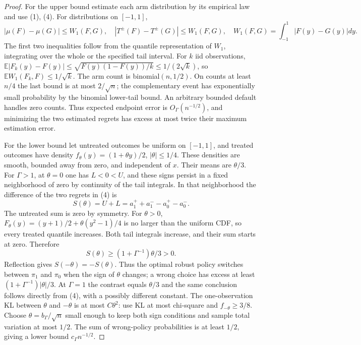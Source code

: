 \documentclass[11pt]{article}
\theoremstyle{definition}
\begin{document}
\begin{proof}
For the upper bound estimate each arm distribution by its empirical law
and use (1), (4). For distributions on $[-1,1]$,
\[
 |\mu(F)-\mu(G)|\le W_1(F,G),\quad
 |T^\pm(F)-T^\pm(G)|\le W_1(F,G),\quad
 W_1(F,G)=\int_{-1}^1|F(y)-G(y)|dy.
\]
The first two inequalities follow from the quantile representation of
$W_1$, integrating over the whole or the specified tail interval.
For $k$ iid observations,
$\mathbb E|F_k(y)-F(y)|\le\sqrt{F(y)(1-F(y))/k}\le1/(2\sqrt k)$,
so $\mathbb E W_1(F_k,F)\le1/\sqrt k$.
The arm count is binomial$(n,1/2)$. On counts at least $n/4$ the last
bound is at most $2/\sqrt n$; the complementary event has exponentially
small probability by the binomial lower-tail bound. An arbitrary
bounded default handles zero counts. Thus expected endpoint error is
$O_\Gamma(n^{-1/2})$, and minimizing the two estimated regrets has excess
at most twice their maximum estimation error.

For the lower bound let untreated outcomes be uniform on $[-1,1]$,
and treated outcomes have density $f_\theta(y)=(1+\theta y)/2$,
$|\theta|\le1/4$. These densities are smooth, bounded away from zero,
and independent of $x$. Their means are $\theta/3$.
For $\Gamma>1$, at $\theta=0$ one has $L<0<U$, and these signs persist
in a fixed neighborhood of zero by continuity of the tail integrals.
In that neighborhood the difference of the two regrets in (4) is
\[
 S(\theta)=U+L=a_1^++a_1^--a_0^+-a_0^-.
\]
The untreated sum is zero by symmetry. For $\theta>0$,
$F_\theta(y)=(y+1)/2+\theta(y^2-1)/4$ is no larger than the uniform CDF,
so every treated quantile increases. Both tail integrals increase, and
their sum starts at zero. Therefore
\[
 S(\theta)\ge (1+\Gamma^{-1})\theta/3>0.
\]
Reflection gives $S(-\theta)=-S(\theta)$. Thus the optimal robust policy
switches between $\pi_1$ and $\pi_0$ when the sign of $\theta$ changes;
a wrong choice has excess at least $(1+\Gamma^{-1})|\theta|/3$.
At $\Gamma=1$ the contrast equals $\theta/3$ and the same conclusion
follows directly from (4), with a possibly different constant.
The one-observation KL between $\theta$ and $-\theta$ is at most
$C\theta^2$: use KL at most chi-square and $f_{-\theta}\ge3/8$.
Choose $\theta=b_\Gamma/\sqrt n$ small enough to keep both sign conditions
and sample total variation at most $1/2$. The sum of wrong-policy
probabilities is at least $1/2$, giving a lower bound
$c_\Gamma n^{-1/2}$.
\end{proof}
\end{document}
